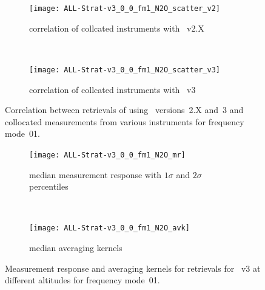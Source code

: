 \begin{figure}[tbhp]
    \centering
    \begin{subfigure}[b]{0.49\textwidth}
        \texttt{[image: ALL-Strat-v3\_0\_0\_fm1\_N2O\_scatter\_v2]}
        \caption{correlation of collcated instruments with \smr~v2.X}
        \label{fig:fm01:N2O:scatter:v2}
    \end{subfigure}
    \,
    \begin{subfigure}[b]{0.49\textwidth}
        \texttt{[image: ALL-Strat-v3\_0\_0\_fm1\_N2O\_scatter\_v3]}
        \caption{correlation of collcated instruments with \smr~v3}
        \label{fig:fm01:N2O:scatter:v3}
    \end{subfigure}
    \caption{Correlation between retrievals of  using \smr\
    versions~2.X and~3 and collocated measurements from various instruments
    for frequency mode~01.}
    \label{fig:fm01:N2O:scatter}
\end{figure}

\begin{figure}[tbhp]
    \centering
    \begin{subfigure}[b]{0.49\textwidth}
        \texttt{[image: ALL-Strat-v3\_0\_0\_fm1\_N2O\_mr]}
        \caption{median measurement response with $1\sigma$ and $2\sigma$
        percentiles}
        \label{fig:fm01:N2O:mr}
    \end{subfigure}
    \,
    \begin{subfigure}[b]{0.49\textwidth}
        \texttt{[image: ALL-Strat-v3\_0\_0\_fm1\_N2O\_avk]}
        \caption{median averaging kernels\newline~}
        \label{fig:fm01:N2O:avk}
    \end{subfigure}
    \caption{Measurement response and averaging kernels for 
    retrievals for \smr~v3 at different altitudes for frequency mode~01.}
    \label{fig:fm01:N2O:mr_avk}
\end{figure}



